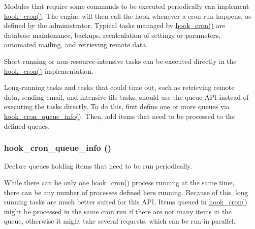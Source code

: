 Modules that require some commands to be executed periodically can implement \hyperlink{group__hooks_gaf07f1e3d98112fc2ba6920cf7ee6fb16}{hook\_\-cron()}. The engine will then call the hook whenever a cron run happens, as defined by the administrator. Typical tasks managed by \hyperlink{group__hooks_gaf07f1e3d98112fc2ba6920cf7ee6fb16}{hook\_\-cron()} are database maintenance, backups, recalculation of settings or parameters, automated mailing, and retrieving remote data.

Short-\/running or non-\/resource-\/intensive tasks can be executed directly in the \hyperlink{group__hooks_gaf07f1e3d98112fc2ba6920cf7ee6fb16}{hook\_\-cron()} implementation.

Long-\/running tasks and tasks that could time out, such as retrieving remote data, sending email, and intensive file tasks, should use the queue API instead of executing the tasks directly. To do this, first define one or more queues via \hyperlink{group__hooks_gae161ed78fd5e8775ffc9264346a64320}{hook\_\-cron\_\-queue\_\-info()}. Then, add items that need to be processed to the defined queues. \hypertarget{group__hooks_gae161ed78fd5e8775ffc9264346a64320}{
\subsubsection[{hook\_\-cron\_\-queue\_\-info}]{\setlength{\rightskip}{0pt plus 5cm}hook\_\-cron\_\-queue\_\-info ()}}
\label{group__hooks_gae161ed78fd5e8775ffc9264346a64320}
Declare queues holding items that need to be run periodically.

While there can be only one \hyperlink{group__hooks_gaf07f1e3d98112fc2ba6920cf7ee6fb16}{hook\_\-cron()} process running at the same time, there can be any number of processes defined here running. Because of this, long running tasks are much better suited for this API. Items queued in \hyperlink{group__hooks_gaf07f1e3d98112fc2ba6920cf7ee6fb16}{hook\_\-cron()} might be processed in the same cron run if there are not many items in the queue, otherwise it might take several requests, which can be run in parallel.

